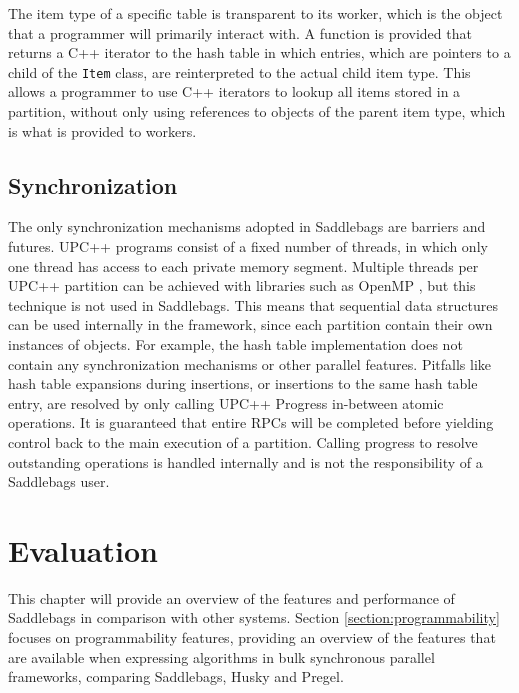 \documentclass{uit-report}
\begin{document}
The item type of a specific table is transparent to its worker, which is the object that a programmer will primarily interact with. A function is provided that returns a C++ iterator to the hash table in which entries, which are pointers to a child of the \texttt{Item} class, are reinterpreted to the actual child item type. This allows a programmer to use C++ iterators to lookup all items stored in a partition, without only using references to objects of the parent item type, which is what is provided to workers.

\section{Synchronization}
The only synchronization mechanisms adopted in Saddlebags are barriers and futures. UPC++ programs consist of a fixed number of threads, in which only one thread has access to each private memory segment. Multiple threads per UPC++ partition can be achieved with libraries such as OpenMP \cite{openmp}, but this technique is not used in Saddlebags. This means that sequential data structures can be used internally in the framework, since each partition contain their own instances of objects. For example, the hash table implementation does not contain any synchronization mechanisms or other parallel features. Pitfalls like hash table expansions during insertions, or insertions to the same hash table entry, are resolved by only calling UPC++ Progress in-between atomic operations. It is guaranteed that entire RPCs will be completed before yielding control back to the main execution of a partition. Calling progress to resolve outstanding operations is handled internally and is not the responsibility of a Saddlebags user.


%

\newpage
\chapter{Evaluation}
This chapter will provide an overview of the features and performance of Saddlebags in comparison with other systems. Section \ref{section:programmability} focuses on programmability features, providing an overview of the features that are available when expressing algorithms in bulk synchronous parallel frameworks, comparing Saddlebags, Husky and Pregel.
\end{document}

